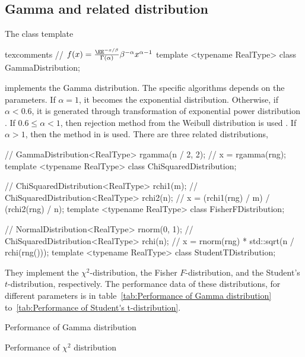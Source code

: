 \subsection{Gamma and related distribution}
\label{sub:Gamma and related distribution}

The class template
\begin{cppcode*}{texcomments}
  // $f(x) = \frac{\EE^{-x/\beta}}{\Gamma(\alpha)}\beta^{-\alpha}x^{\alpha-1}$
  template <typename RealType>
  class GammaDistribution;
\end{cppcode*}
implements the Gamma distribution. The specific algorithms depends on the
parameters. If $\alpha = 1$, it becomes the exponential distribution.
Otherwise, if $\alpha < 0.6$, it is generated through transformation of
exponential power distribution \parencite[sec~2.6]{Devroye:1986gi}. If
$0.6\le\alpha<1$, then rejection method from the Weibull distribution is used
\parencite[sec.~3.4]{Devroye:1986gi}. If $\alpha > 1$, then the method in
\textcite{Marsaglia:2000vq} is used. There are three related distributions,
\begin{cppcode}
  // GammaDistribution<RealType> rgamma(n / 2, 2);
  // x = rgamma(rng);
  template <typename RealType>
  class ChiSquaredDistribution;

  // ChiSquaredDistribution<RealType> rchi1(m);
  // ChiSquaredDistribution<RealType> rchi2(n);
  // x = (rchi1(rng) / m) / (rchi2(rng) / n);
  template <typename RealType>
  class FisherFDistribution;

  // NormalDistribution<RealType> rnorm(0, 1);
  // ChiSquaredDistribution<RealType> rchi(n);
  // x = rnorm(rng) * std::sqrt(n / rchi(rng()));
  template <typename RealType>
  class StudentTDistribution;
\end{cppcode}
They implement the $\chi^2$-distribution, the Fisher $F$-distribution, and the
Student's $t$-distribution, respectively. The performance data of these
distributions, for different parameters is in table~\ref{tab:Performance of
  Gamma distribution} to~\ref{tab:Performance of Student's t-distribution}.

\begin{table}
  
  \caption{Performance of Gamma distribution}
  \label{tab:Performance of Gamma distribution}
\end{table}

\begin{table}
  
  \caption{Performance of $\chi^2$ distribution}
  \label{tab:Performance of chi-squared distribution}
\end{table}


